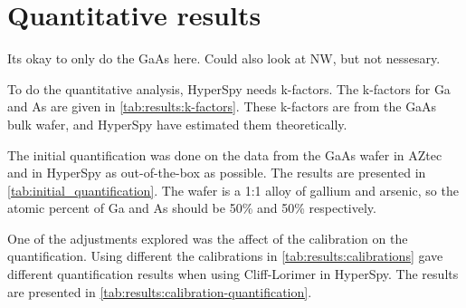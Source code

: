 





\section{Quantitative results}
\label{sec:results:quantification}




Its okay to only do the GaAs here.
Could also look at NW, but not nessesary.

To do the quantitative analysis, HyperSpy needs k-factors.
The k-factors for Ga and As are given in \cref{tab:results:k-factors}.
These k-factors are from the GaAs bulk wafer, and HyperSpy have estimated them theoretically.



The initial quantification was done on the data from the GaAs wafer in AZtec and in HyperSpy as out-of-the-box as possible.
The results are presented in \cref{tab:initial_quantification}.
The wafer is a 1:1 alloy of gallium and arsenic, so the atomic percent of Ga and As should be 50\% and 50\% respectively.




One of the adjustments explored was the affect of the calibration on the quantification.
Using different the calibrations in \ref{tab:results:calibrations} gave different quantification results when using Cliff-Lorimer in HyperSpy.
The results are presented in \cref{tab:results:calibration-quantification}.







